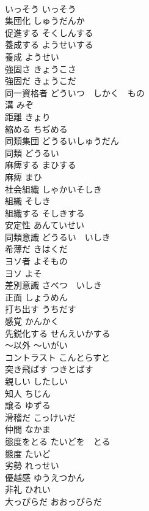 \documentclass[8pt]{extreport}
\begin{document}
\begin{CJK}{UTF8}{min}
\\	いっそう	いっそう	
\\	集団化	しゅうだんか	
\\	促進する	そくしんする	
\\	養成する	ようせいする	
\\	養成	ようせい	
\\	強固さ	きょうこさ	
\\	強固だ	きょうこだ	
\\	同一資格者	どういつ　しかく　もの	
\\	溝	みぞ	
\\	距離	きょり	
\\	縮める	ちぢめる	
\\	同類集団	どうるいしゅうだん	
\\	同類	どうるい	
\\	麻痺する	まひする	
\\	麻痺	まひ	
\\	社会組織	しゃかいそしき	
\\	組織	そしき	
\\	組織する	そしきする	
\\	安定性	あんていせい	
\\	同類意識	どうるい　いしき	
\\	希薄だ	きはくだ	
\\	ヨソ者	よそもの	
\\	ヨソ	よそ	
\\	差別意識	さべつ　いしき	
\\	正面	しょうめん	
\\	打ち出す	うちだす	
\\	感覚	かんかく	
\\	先鋭化する	せんえいかする	
\\	〜以外	〜いがい	
\\	コントラスト	こんとらすと	
\\	突き飛ばす	つきとばす	
\\	親しい	したしい	
\\	知人	ちじん	
\\	譲る	ゆずる	
\\	滑稽だ	こっけいだ	
\\	仲間	なかま	
\\	態度をとる	たいどを　とる	
\\	態度	たいど	
\\	劣勢	れっせい	
\\	優越感	ゆうえつかん	
\\	非礼	ひれい	
\\	大っぴらだ	おおっぴらだ	

\end{CJK}
\end{document}
